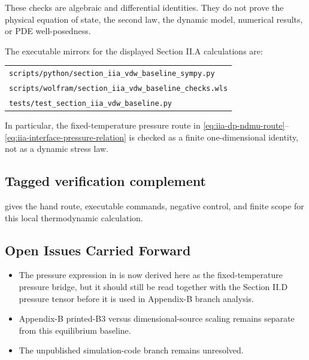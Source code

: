 These checks are algebraic and differential identities.  They do not prove the
physical equation of state, the second law, the dynamic model, numerical
results, or PDE well-posedness.

The executable mirrors for the displayed Section II.A calculations are:
\begin{center}
\small
\begin{tabular}{@{}l@{}}
\texttt{scripts/python/section\_iia\_vdw\_baseline\_sympy.py}\\
\texttt{scripts/wolfram/section\_iia\_vdw\_baseline\_checks.wls}\\
\texttt{tests/test\_section\_iia\_vdw\_baseline.py}
\end{tabular}
\end{center}
In particular, the fixed-temperature pressure route in
\eqref{eq:iia-dp-ndmu-route}--\eqref{eq:iia-interface-pressure-relation} is
checked as a finite one-dimensional identity, not as a dynamic stress law.

\subsection*{Tagged verification complement}

 gives the hand
route, executable commands, negative control, and finite scope for this local
thermodynamic calculation.

\subsection{Open Issues Carried Forward}

\begin{itemize}
\item The pressure expression in  is now derived here as the
  fixed-temperature pressure bridge, but it should still be read together with
  the Section II.D pressure tensor before it is used in Appendix-B branch analysis.
\item Appendix-B printed-B3 versus dimensional-source scaling remains separate
  from this equilibrium baseline.
\item The unpublished simulation-code branch remains unresolved.
\end{itemize}
